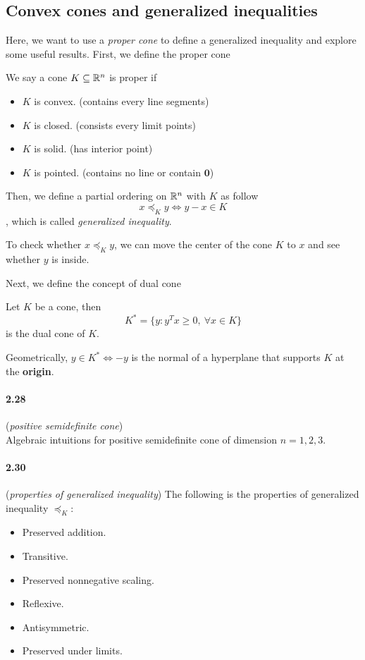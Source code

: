 \documentclass[11pt]{article}
\begin{document}
\subsection{Convex cones and generalized inequalities}
Here, we want to use a {\it proper cone} to define a generalized inequality and explore some useful results. First, we define the proper cone 
\begin{definition}
	We say a cone $K\subseteq{\mathbb R}^n$ is proper if
	\begin{itemize}
		\item $K$ is convex. (contains every line segments)
		\item $K$ is closed. (consists every limit points)
		\item $K$ is solid. (has interior point)
		\item $K$ is pointed. (contains no line or contain $\mathbf{0}$)
	\end{itemize}
\end{definition}
Then, we define a partial ordering on ${\mathbb R}^n$ with $K$ as follow
$$x\preceq_Ky\Leftrightarrow y-x\in K$$
, which is called {\it generalized inequality}.
\begin{intuition}
	To check whether $x\preceq_Ky$, we can move the center of the cone $K$ to $x$ and see whether $y$ is inside.
\end{intuition}
Next, we define the concept of dual cone
\begin{definition}
	Let $K$ be a cone, then
	$$K^* = \{y: y^Tx\geq0,\ \forall x\in K\}$$
	is the dual cone of $K$.
\end{definition}
\begin{intuition}
	Geometrically, $y\in K^*\Leftrightarrow-y$ is the normal of a hyperplane that supports $K$ at the {\bf origin}.
\end{intuition}
\paragraph{2.28}({\it positive semidefinite cone})\\
\goal Algebraic intuitions for positive semidefinite cone of dimension $n=1,2,3$.
\paragraph{2.30}({\it properties of generalized inequality})
The following is the properties of generalized inequality $\preceq_K$:
\begin{itemize}
	\item Preserved addition.
	\item Transitive.
	\item Preserved nonnegative scaling.
	\item Reflexive.
	\item Antisymmetric.
	\item Preserved under limits.
\end{itemize}
\end{document}
